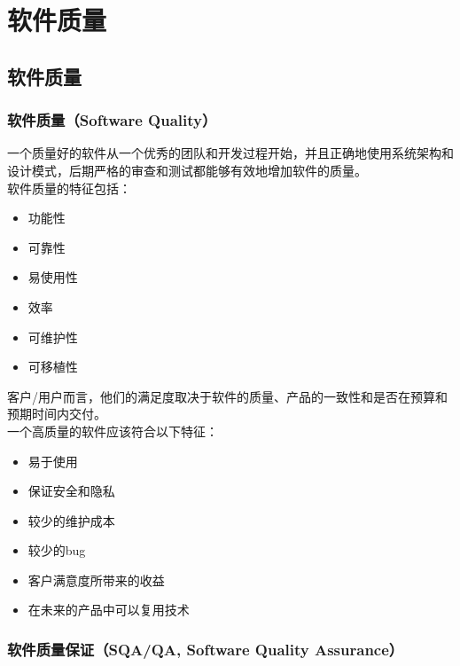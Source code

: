 \chapter{软件质量}

\section{软件质量}

\subsection{软件质量（Software Quality）}

一个质量好的软件从一个优秀的团队和开发过程开始，并且正确地使用系统架构和设计模式，后期严格的审查和测试都能够有效地增加软件的质量。\\

软件质量的特征包括：

\begin{itemize}
    \item 功能性
    \item 可靠性
    \item 易使用性
    \item 效率
    \item 可维护性
    \item 可移植性
\end{itemize}

客户/用户而言，他们的满足度取决于软件的质量、产品的一致性和是否在预算和预期时间内交付。\\

一个高质量的软件应该符合以下特征：

\begin{itemize}
    \item 易于使用
    \item 保证安全和隐私
    \item 较少的维护成本
    \item 较少的bug
    \item 客户满意度所带来的收益
    \item 在未来的产品中可以复用技术
\end{itemize}

\vspace{0.5cm}

\subsection{软件质量保证（SQA/QA, Software Quality Assurance）}

